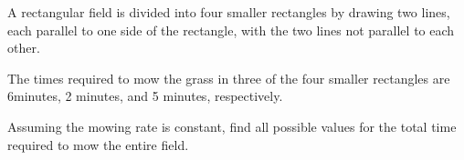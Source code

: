 A rectangular field is divided into four smaller rectangles by drawing two lines, each parallel to one side of the rectangle, with the two lines not parallel to each other.



The times required to mow the grass in three of the four smaller rectangles are 6minutes, 2 minutes, and 5 minutes, respectively.



Assuming the mowing rate is constant, find all possible values for the total time required to mow the entire field.
